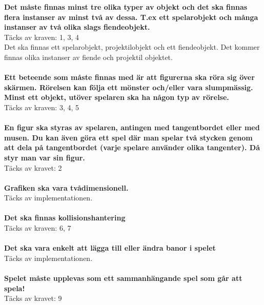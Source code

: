 \documentclass{TDP005mall}
\begin{document}
\textbf{Det måste finnas minst tre olika typer av objekt och det ska finnas flera instanser av minst två av dessa. T.ex ett spelarobjekt och många instanser av två olika slags fiendeobjekt.}
\\
Täcks av kraven: 1, 3, 4\\
Det ska finnas ett spelarobjekt, projektilobjekt och ett fiendeobjekt.
Det kommer finnas olika instanser av fiende och projektil objektet.
\\\\
\textbf{Ett beteende som måste finnas med är att figurerna ska röra sig över skärmen. Rörelsen kan följa ett mönster och/eller vara slumpmässig. Minst ett objekt, utöver spelaren ska ha någon typ av rörelse.}
\\
Täcks av kraven: 3, 4, 5 
\\\\
\textbf{En figur ska styras av spelaren, antingen med tangentbordet eller med musen. Du kan även göra ett spel där man spelar två stycken genom att dela på tangentbordet (varje spelare använder olika tangenter). Då styr man var sin figur.}
\\
Täcks av kravet: 2 
\\\\
\textbf{Grafiken ska vara tvådimensionell.}
\\
Täcks av implementationen.
\\\\
\textbf{Det ska finnas kollisionshantering}
\\
Täcks av kraven: 6, 7 
\\\\
\textbf{Det ska vara enkelt att lägga till eller ändra banor i spelet}
\\
Täcks av implementationen.
\\\\
\textbf{Spelet måste upplevas som ett sammanhängande spel som går att spela!}
\\
Täcks av kravet: 9
\end{document}
